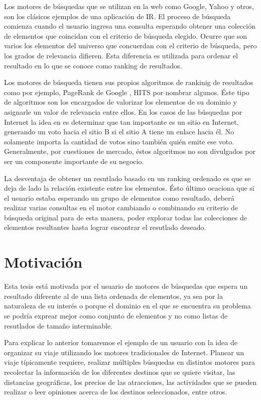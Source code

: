 Los motores de búsquedas que se utilizan en la web como Google, Yahoo y otros, son los clásicos ejemplos de una aplicación de IR. El proceso de búsqueda comienza cuando el usuario ingresa una consulta esperando obtener una colección de elementos que coincidan con el criterio de búsqueda elegido. Ocurre que son varios los elementos del universo que concuerdan con el criterio de búsqueda, pero los grados de relevancia difieren. Esta diferencia es utilizada para ordenar el resultado en lo que se conoce como ranking de resultados.

Los motores de búsqueda tienen sus propios algoritmos de rankinig de resultados como por ejemplo, PageRank de Google \cite{Brin:1998:ALH:297810.297827}, HITS \cite{Kleinberg:1999:ASH:324133.324140} por nombrar algunos. Éste tipo de algoritmos son los encargados de valorizar los elementos de su dominio y asignarle un valor de relevancia entre ellos. En los casos de las búsquedas por Internet la idea en \cite{Brin:1998:ALH:297810.297827} es determinar que tan importante es un sitio en Internet, generando un voto hacia el sitio B si el sitio A tiene un enlace hacia él. No solamente importa la cantidad de votos sino también quién emite ese voto. Generalmente, por cuestiones de mercado, éstos algoritmos no son divulgados por ser un componente importante de su negocio. 

La desventaja de obtener un resutlado basado en un ranking ordenado es que se deja de lado la relación existente entre los elementos. Ésto último ocaciona que si el usuario estaba esperando un grupo de elementos como resultado, deberá realizar varias consultas en el motor cambiando o combinando su criterio de búsqueda original para de esta manera, poder explorar todas las colecciones de elementos resultantes hasta lograr encontrar el resutlado deseado.

\section{Motivación}
Esta tesis está motivada por el usuario de motores de búsquedas que espera un resultado diferente al de una lista ordenada de elementos, ya sea por la naturaleza de su interés o porque el dominio en el que se encuentra su problema se podría exprear mejor como conjunto de elementos y no como listas de resutlados de tamaño interminable.

Para explicar lo anterior tomaremos el ejemplo de un usuario con la idea de organizar su viaje utilizando los motores tradicionales de Internet. Planear un viaje típicamente requiere, realizar múltiples búsquedas en distintos motores para recolectar la información de los diferentes destinos que se quiere visitar, las distancias geográficas, los precios de las atracciones, las actividades que se pueden realizar o leer opiniones acerca de los destinos seleccionados, entre otros.

